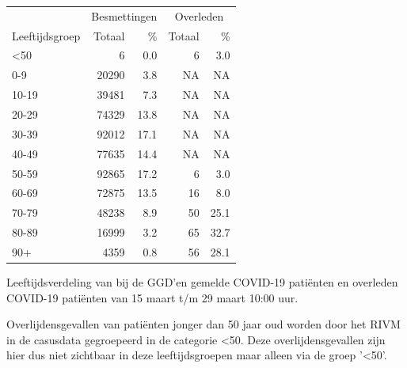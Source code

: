 \documentclass[
  english,
  man,floatsintext]{apa6}
\begin{document}
\begin{table}
\centering\begingroup\fontsize{11}{13}\selectfont

\begin{threeparttable}
\begin{tabular}{lrrrr}
\toprule
\multicolumn{1}{c}{ } & \multicolumn{2}{c}{Besmettingen} & \multicolumn{2}{c}{Overleden} \\
\cmidrule(l{3pt}r{3pt}){2-3} \cmidrule(l{3pt}r{3pt}){4-5}
Leeftijdsgroep & Totaal & \% & Totaal & \%\\
\midrule
<50 & 6 & 0.0 & 6 & 3.0\\
0-9 & 20290 & 3.8 & NA & NA\\
10-19 & 39481 & 7.3 & NA & NA\\
20-29 & 74329 & 13.8 & NA & NA\\
30-39 & 92012 & 17.1 & NA & NA\\
40-49 & 77635 & 14.4 & NA & NA\\
50-59 & 92865 & 17.2 & 6 & 3.0\\
60-69 & 72875 & 13.5 & 16 & 8.0\\
70-79 & 48238 & 8.9 & 50 & 25.1\\
80-89 & 16999 & 3.2 & 65 & 32.7\\
90+ & 4359 & 0.8 & 56 & 28.1\\
\bottomrule
\end{tabular}
\begin{tablenotes}
\item[1] Leeftijdsverdeling van bij de GGD’en gemelde COVID-19 patiënten en overleden COVID-19 patiënten van 15 maart t/m 29 maart 10:00 uur.
\item[2] Overlijdensgevallen van patiënten jonger dan 50 jaar oud worden door het RIVM in de casusdata gegroepeerd in de categorie <50. Deze overlijdensgevallen zijn hier dus niet zichtbaar in deze leeftijdsgroepen maar alleen via de groep '<50'.
\end{tablenotes}
\end{threeparttable}
\endgroup{}
\end{table}

\newpage
\end{document}
